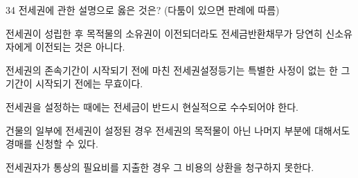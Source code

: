\begin{question}{34}
전세권에 관한 설명으로 옳은 것은? (다툼이 있으면 판례에 따름)
\begin{choices}
  \item 전세권이 성립한 후 목적물의 소유권이 이전되더라도 전세금반환채무가 당연히 신소유자에게 이전되는 것은 아니다.
  \item 전세권의 존속기간이 시작되기 전에 마친 전세권설정등기는 특별한 사정이 없는 한 그 기간이 시작되기 전에는 무효이다.
  \item 전세권을 설정하는 때에는 전세금이 반드시 현실적으로 수수되어야 한다.
  \item 건물의 일부에 전세권이 설정된 경우 전세권의 목적물이 아닌 나머지 부분에 대해서도 경매를 신청할 수 있다.
  \item 전세권자가 통상의 필요비를 지출한 경우 그 비용의 상환을 청구하지 못한다.
\end{choices}
\end{question}
